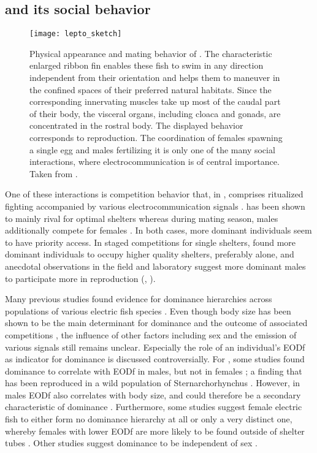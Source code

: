 \subsection{\Lepto{} and its social behavior}

\begin{figure}[h!]
	\centerline{\texttt{[image: lepto\_sketch]}}
	\caption{\label{lepto_sketch} Physical appearance and mating behavior of \lepto{}. The characteristic enlarged ribbon fin enables these fish to swim in any direction independent from their orientation and helps them to maneuver in the confined spaces of their preferred natural habitats. Since the corresponding innervating muscles take up most of the caudal part of their  body, the visceral organs, including cloaca and gonads, are concentrated in the rostral body. The displayed behavior corresponds to reproduction. The coordination of females spawning a single egg and males fertilizing it is only one of the many social interactions, where electrocommunication is of central importance. Taken from \citet{Hagedorn1985}.}
\end{figure}

One of these interactions is competition behavior that, in \lepto{}, comprises ritualized fighting accompanied by various electrocommunication signals \citep{Triefenbach2008, Smith2013}. \lepto{} has been shown to mainly rival for optimal shelters whereas during mating season, males additionally compete for females \citep{Hagedorn1985, Dunlap2002, Henninger2018}. In both cases, more dominant individuals seem to have priority access. In staged competitions for single shelters, \citet{Dunlap2002} found more dominant individuals to occupy higher quality shelters, preferably alone, and anecdotal observations in the field and laboratory suggest more dominant males to participate more in reproduction (\citealp{Hagedorn1985, Henninger2018}, ). 

Many previous studies found evidence for dominance hierarchies across populations of various electric fish species \citep{Dunlap2002, Stamper2010, Fugere2011, Silva2012}. Even though body size has been shown to be the main determinant for dominance and the outcome of associated competitions \citep{Dunlap2002, Triefenbach2008, Silva2012}, the influence of other factors including sex and the emission of various signals still remains unclear. Especially the role of an individual's EODf as indicator for dominance is discussed controversially. For \lepto{}, some studies found dominance to correlate with EODf in males, but not in females \citep{Hagedorn1985, Dunlap2002}; a finding that has been reproduced in a wild population of Sternarchorhynchus \citep{Fugere2011}. However, in males EODf also correlates with body size, and could therefore be a secondary characteristic of dominance \citep{Dunlap2002, Triefenbach2008, Fugere2011}. Furthermore, some studies suggest female electric fish to either form no dominance hierarchy at all \citep{Hagedorn1985} or only a very distinct one, whereby females with lower EODf are more likely to be found outside of shelter tubes \citep{Dunlap2002}. Other studies suggest dominance to be independent of sex \citep{Silva2012, Zubizarreta2020}. 

